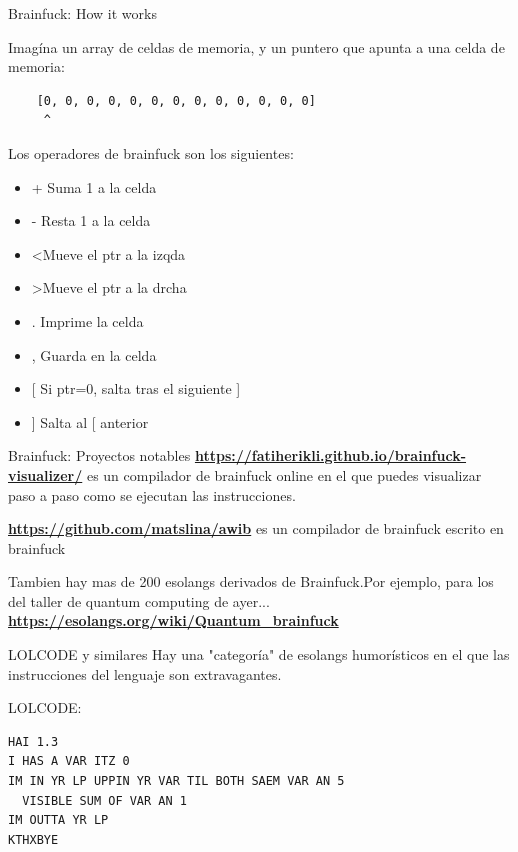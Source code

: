 \documentclass{beamer}
\begin{document}
\begin{frame}[fragile]{Brainfuck: How it works}

Imagína un array de celdas de memoria, y un puntero que apunta a una celda de memoria:
\begin{lstlisting}
    [0, 0, 0, 0, 0, 0, 0, 0, 0, 0, 0, 0, 0]
     ^
\end{lstlisting}

Los operadores de brainfuck son los siguientes:
\begin{multicols}{2}
\begin{itemize}
    \item + Suma 1 a la celda
    \item - Resta 1 a la celda
    \item \textless Mueve el ptr a la izqda
    \item \textgreater Mueve el ptr a la drcha
    \item . Imprime la celda
    \item , Guarda en la celda
    \item {[} Si ptr=0, salta tras el siguiente {]}
    \item {]} Salta al {[} anterior
    \end{itemize}
\end{multicols}
\end{frame}

\begin{frame}{Brainfuck: Proyectos notables}
\textbf{\hyperlink{https://fatiherikli.github.io/brainfuck-visualizer/}{https://fatiherikli.github.io/brainfuck-visualizer/}} es un compilador de brainfuck online en el que puedes visualizar paso a paso como se ejecutan las instrucciones.

\textbf{\hyperlink{https://github.com/matslina/awib}{https://github.com/matslina/awib}}
 es un compilador de brainfuck escrito en brainfuck
    
Tambien hay mas de 200 esolangs derivados de Brainfuck.\pause Por ejemplo, para los del taller de quantum computing de ayer...
\textbf{\hyperlink{https://esolangs.org/wiki/Quantum_brainfuck
}{https://esolangs.org/wiki/Quantum\_brainfuck}} 
\end{frame}

\begin{frame}[fragile]{LOLCODE y similares}
Hay una "categoría" de esolangs humorísticos en el que las instrucciones del lenguaje son extravagantes.

LOLCODE:
\begin{lstlisting}
HAI 1.3
I HAS A VAR ITZ 0
IM IN YR LP UPPIN YR VAR TIL BOTH SAEM VAR AN 5
  VISIBLE SUM OF VAR AN 1 
IM OUTTA YR LP
KTHXBYE
\end{lstlisting}
\end{frame}
\end{document}
